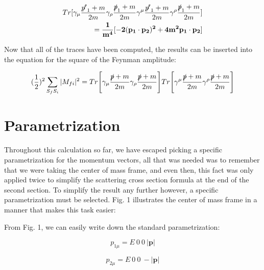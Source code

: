 \documentclass[a4]{article}
\begin{document}
    \begin{framed}
        \begin{eqnarray}
            Tr [\gamma_\mu \frac{\slashed{p'}_1 + m}{2m} \gamma_\rho \frac{\slashed{p}_1 + m}{2 m} \gamma^\mu \frac{\slashed{p'}_1 + m}{2m} \gamma^\rho \frac{\slashed{p}_1 + m}{2 m}] \\
            = \mathbf{\frac{1}{m^4} [-2 (p_1 \cdot p_2)^2 + 4 m^2 p_1 \cdot p_2]}
        \end{eqnarray}
    \end{framed}

    Now that all of the traces have been computed, the results can be inserted into the equation for the square of the Feynman amplitude:

    \begin{framed}
        \begin{eqnarray}
            (\frac{1}{2})^2 \sum_{S_f S_i} |M_{f i}|^2 = Tr \Bigg[ \gamma_{\mu} \frac{\slashed{p} + m}{2m} \gamma_{\rho} \frac{\slashed{p} + m}{2m} \Bigg] Tr \Bigg[ \gamma^{\mu} \frac{\slashed{p} + m}{2m} \gamma^{\rho} \frac{\slashed{p} + m}{2m} \Bigg]
        \end{eqnarray}
    \end{framed}

    \section*{Parametrization}

    Throughout this calculation so far, we have escaped picking a specific parametrization for the momentum vectors, all that was needed was to remember that we were taking the center of mass frame, and even then, this fact was only applied twice to simplify
    the scattering cross section formula at the end of the second section. To simplify the result any further however, a specific parametrization must be selected. Fig. 1 illustrates the center of mass frame in a manner that makes this task easier:


    From Fig. 1, we can easily write down the standard parametrization: 

    \begin{equation}
        p_{1 \mu} = E \: 0 \: 0 \: |\mathbf{p}|
    \end{equation}
    
    \begin{equation}
        p_{2 \mu} = E \: 0 \: 0 \: - |\mathbf{p}|
    \end{equation}
\end{document}
